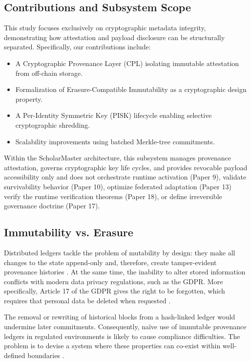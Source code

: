 \documentclass[conference]{IEEEtran}
\begin{document}
\subsection{Contributions and Subsystem Scope}
This study focuses exclusively on cryptographic metadata integrity, demonstrating how attestation and payload disclosure can be structurally separated. Specifically, our contributions include:
\begin{itemize}
    \item A Cryptographic Provenance Layer (CPL) isolating immutable attestation from off-chain storage.
    \item Formalization of Erasure-Compatible Immutability as a cryptographic design property.
    \item A Per-Identity Symmetric Key (PISK) lifecycle enabling selective cryptographic shredding.
    \item Scalability improvements using batched Merkle-tree commitments.
\end{itemize}

Within the ScholarMaster architecture, this subsystem manages provenance attestation, governs cryptographic key life cycles, and provides revocable payload accessibility only and does not orchestrate runtime activation (Paper 9), validate survivability behavior (Paper 10), optimize federated adaptation (Paper 13) verify the runtime verification theorems (Paper 18), or define irreversible governance doctrine (Paper 17).

\subsection{Immutability vs. Erasure}

Distributed ledgers tackle the problem of mutability by design: they make all changes to the state append-only and, therefore, create tamper-evident provenance histories \cite{b12}. At the same time, the inability to alter stored information conflicts with modern data privacy regulations, such as the GDPR. More specifically, Article 17 of the GDPR gives the right to be forgotten, which requires that personal data be deleted when requested \cite{b23}.

The removal or rewriting of historical blocks from a hash-linked ledger would undermine later commitments. Consequently, na\"ive use of immutable provenance ledgers in regulated environments is likely to cause compliance difficulties. The problem is to devise a system where these properties can co-exist within well-defined boundaries \cite{b19}.
\end{document}
